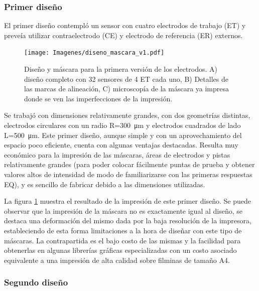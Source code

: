 		 \subsubsection{Primer diseño}

		     El primer diseño contempló un sensor con cuatro electrodos de trabajo (ET) y preveía utilizar contraelectrodo (CE) y electrodo de referencia (ER) externos. 

		    	\begin{figure}[bh!]
		 	       	\texttt{[image: Imagenes/diseno\_mascara\_v1.pdf]}
 		       		\caption[Primer diseño y máscara de los sensores]{Diseño y máscara para la primera versión de los electrodos. A) diseño completo con 32 sensores de 4 ET cada uno, B) Detalles de las marcas de alineación, C) microscopía de la máscara ya impresa donde se ven las imperfecciones de la impresión.}
 		         	\label{fig:diseno_mascara_v1}
 		     		\end{figure}
 		 	  		     		
		      Se trabajó con dimensiones relativamente grandes, con dos geometrías distintas, electrodos circulares con un radio R=\SI{300}{\um} y electrodos cuadrados de lado L=\SI{500}{\um}. Este primer diseño, aunque simple y con un aprovechamiento del espacio poco eficiente, cuenta con algunas ventajas destacadas. Resulta muy económico para la impresión de las máscaras, áreas de electrodos y pistas relativamente grandes (para poder colocar fácilmente puntas de prueba y obtener valores altos de intensidad de modo de familiarizarse con las primeras respuestas EQ), y es sencillo de fabricar debido a las dimensiones utilizadas.
		
		      La figura \ref{fig:diseno_mascara_v1} muestra el resultado de la impresión de este primer diseño. Se puede observar que la impresión de la máscara no es exactamente igual al diseño, se destaca una deformación del mismo dada por la baja resolución de la impresora, estableciendo de esta forma limitaciones a la hora de diseñar con este tipo de máscaras. La contrapartida es el bajo costo de las mismas y la facilidad para obtenerlas en algunas librerías gráficas especializadas con un costo asociado equivalente a una impresión de alta calidad sobre filminas de tamaño A4.
		
 		 \subsubsection{Segundo diseño}

